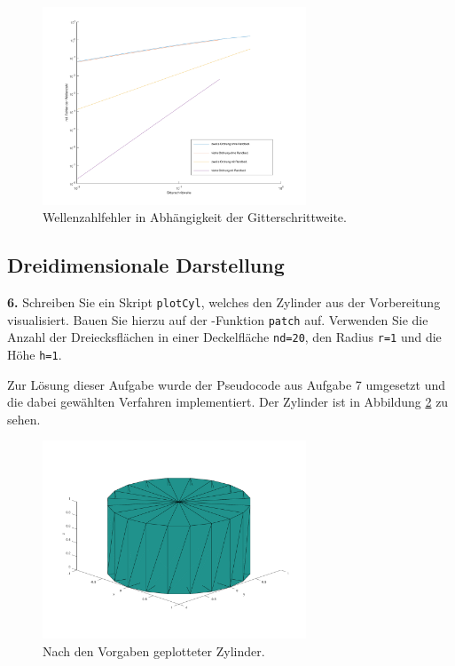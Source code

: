 \documentclass[Protokollheft.tex]{subfiles}
\begin{document}
	\noindent
	\begin{figure}[h]
		\centering
		\includegraphics[trim = 25mm 10mm 25mm 15mm, clip, width=0.7\textwidth]{plotConvloglog.pdf}
		\caption{Wellenzahlfehler in Abhängigkeit der Gitterschrittweite.}
		\label{Abb:plotCovloglog}
	\end{figure}
	
	
	

	{\subsection{Dreidimensionale Darstellung}}
	
	\begin{framed}
		\noindent \textbf{6.} Schreiben Sie ein Skript \lstinline{plotCyl}, welches den Zylinder aus der Vorbereitung visualisiert.
		Bauen Sie hierzu auf der \matlab-Funktion \lstinline{patch} auf. Verwenden Sie die Anzahl der Dreiecksflächen
		in einer Deckelfläche \lstinline{nd=20}, den Radius \lstinline{r=1} und die Höhe \lstinline {h=1}.\label{exer:plotCyl}
	\end{framed}
	\noindent
	Zur Lösung dieser Aufgabe wurde der Pseudocode aus Aufgabe 7 umgesetzt und die dabei gewählten Verfahren implementiert. Der Zylinder ist in Abbildung \ref{Abb:plotCyl} zu sehen.
	\begin{figure}[h]
		\centering
		\includegraphics[trim = 25mm 10mm 25mm 25mm, clip, width=0.7\textwidth]{plotCyl.pdf}
		\caption{Nach den Vorgaben geplotteter Zylinder.}
		\label{Abb:plotCyl}
	\end{figure}
	
\end{document}
